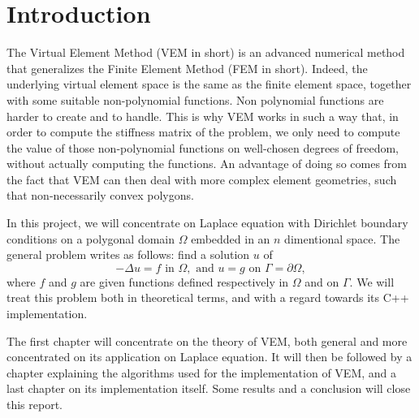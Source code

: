 \newpage
\section*{Introduction} 

The Virtual Element Method (VEM in short) is an advanced numerical method that generalizes the Finite Element Method (FEM in short). Indeed, the underlying virtual element space is the same as the finite element space, together with some suitable non-polynomial functions. Non polynomial functions are harder to create and to handle. This is why VEM works in such a way that, in order to compute the stiffness matrix of the problem, we only need to compute the value of those non-polynomial functions on well-chosen degrees of freedom, without actually computing the functions. An advantage of doing so comes from the fact that VEM can then deal with more complex element geometries, such that non-necessarily convex polygons.


In this project, we will concentrate on Laplace equation with Dirichlet boundary conditions on a polygonal domain $\Omega$ embedded in an $n$ dimentional space. The general problem writes as follows: find a solution $u$ of
$$ -\Delta u = f \text{ in } \Omega, \text{ and } u = g \text{ on } \Gamma = \partial \Omega, $$
where $f$ and $g$ are given functions defined respectively in $\Omega$ and on $\Gamma$.
We will treat this problem both in theoretical terms, and with a regard towards its C++ implementation. \newline

The first chapter will concentrate on the theory of VEM, both general and more concentrated on its application on Laplace equation. It will then be followed by a chapter explaining the algorithms used for the implementation of VEM, and a last chapter on its implementation itself. Some results and a conclusion will close this report. 


